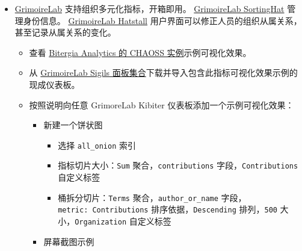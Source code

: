 \begin{itemize}
\item
  \href{https://chaoss.github.io/grimoirelab}{GrimoireLab}
  支持组织多元化指标，开箱即用。
  \href{https://github.com/chaoss/grimoirelab-sortinghat}{GrimoireLab
  SortingHat} 管理身份信息。
  \href{https://github.com/chaoss/grimoirelab-hatstall}{GrimoireLab
  Hatstall} 用户界面可以修正人员的组织从属关系，甚至记录从属关系的变化。

  \begin{itemize}
  \item
    查看
    \href{https://chaoss.biterg.io/app/kibana\#/dashboard/Community-Structure-by-Organization}{Bitergia
    Analytics 的 CHAOSS 实例}示例可视化效果。
  \item
    从
    \href{https://chaoss.github.io/grimoirelab-sigils/panels/community-structure-by-organization/}{GrimoireLab
    Sigils 面板集合}下载并导入包含此指标可视化效果示例的现成仪表板。
  \item
    按照说明向任意 GrimoreLab Kibiter 仪表板添加一个示例可视化效果：

    \begin{itemize}
    \tightlist
    \item
      新建一个饼状图

      \begin{itemize}
      \tightlist
      \item
        选择 \texttt{all\_onion} 索引
      \item
        指标切片大小：\texttt{Sum} 聚合，\texttt{contributions}
        字段，\texttt{Contributions} 自定义标签
      \item
        桶拆分切片：\texttt{Terms} 聚合，\texttt{author\_or\_name}
        字段，\texttt{metric:\ Contributions}
        排序依据，\texttt{Descending} 排列，\texttt{500}
        大小，\texttt{Organization} 自定义标签
      \end{itemize}
    \item
      屏幕截图示例
    \end{itemize}


\end{itemize}
\end{itemize}
